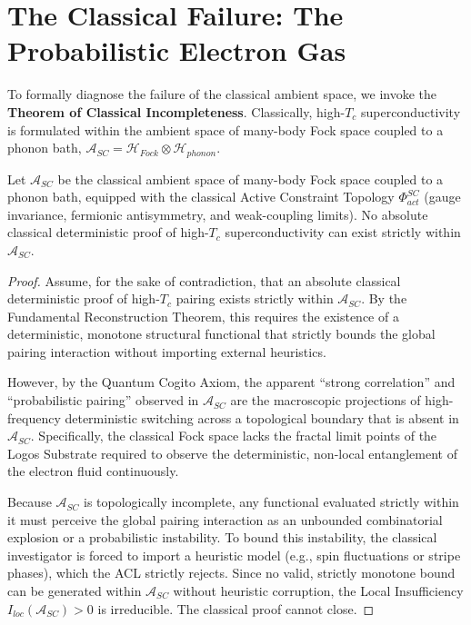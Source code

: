 \documentclass[12pt,twoside]{extbook}
\theoremstyle{definition}
\theoremstyle{remark}
\newcommand{\term}[1]{\textcolor{brandPrimary}{\textbf{#1}}}
\begin{document}
\section{The Classical Failure: The Probabilistic Electron Gas}
To formally diagnose the failure of the classical ambient space, we invoke the \term{Theorem of Classical Incompleteness}. Classically, high-$T_c$ superconductivity is formulated within the ambient space of many-body Fock space coupled to a phonon bath, $\mathcal{A}_{SC} = \mathcal{H}_{Fock} \otimes \mathcal{H}_{phonon}$.

\begin{theorem}
Let $\mathcal{A}_{SC}$ be the classical ambient space of many-body Fock space coupled to a phonon bath, equipped with the classical Active Constraint Topology $\Phi^{SC}_{act}$ (gauge invariance, fermionic antisymmetry, and weak-coupling limits). No absolute classical deterministic proof of high-$T_c$ superconductivity can exist strictly within $\mathcal{A}_{SC}$.
\end{theorem}

\begin{proof}
Assume, for the sake of contradiction, that an absolute classical deterministic proof of high-$T_c$ pairing exists strictly within $\mathcal{A}_{SC}$. By the Fundamental Reconstruction Theorem, this requires the existence of a deterministic, monotone structural functional that strictly bounds the global pairing interaction without importing external heuristics.

However, by the Quantum Cogito Axiom, the apparent ``strong correlation'' and ``probabilistic pairing'' observed in $\mathcal{A}_{SC}$ are the macroscopic projections of high-frequency deterministic switching across a topological boundary that is absent in $\mathcal{A}_{SC}$. Specifically, the classical Fock space lacks the fractal limit points of the Logos Substrate required to observe the deterministic, non-local entanglement of the electron fluid continuously.

Because $\mathcal{A}_{SC}$ is topologically incomplete, any functional evaluated strictly within it must perceive the global pairing interaction as an unbounded combinatorial explosion or a probabilistic instability. To bound this instability, the classical investigator is forced to import a heuristic model (e.g., spin fluctuations or stripe phases), which the ACL strictly rejects. Since no valid, strictly monotone bound can be generated within $\mathcal{A}_{SC}$ without heuristic corruption, the Local Insufficiency $I_{loc}(\mathcal{A}_{SC}) > 0$ is irreducible. The classical proof cannot close.
\end{proof}
\end{document}
